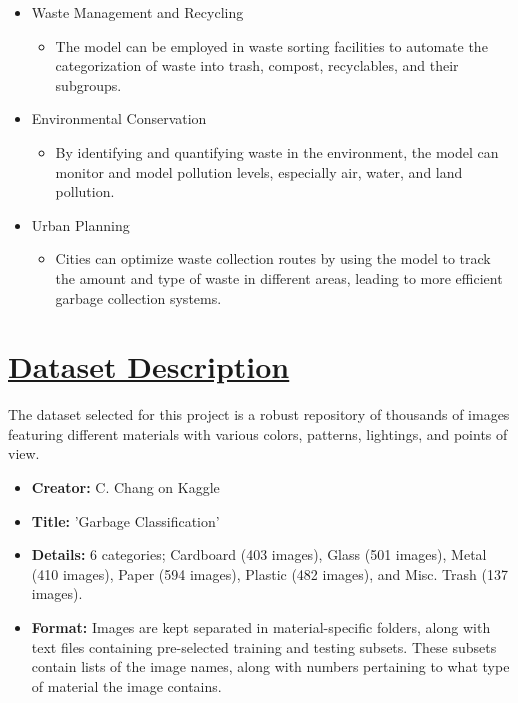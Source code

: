 \documentclass[conference]{IEEEtran}
\begin{document}
\begin{itemize}
  \item Waste Management and Recycling    
    \begin{itemize}
      \item The model can be employed in waste sorting facilities to automate the categorization of waste into trash, compost, recyclables, and their subgroups.
    \end{itemize} 
  \item Environmental Conservation
    \begin{itemize}
      \item By identifying and quantifying waste in the environment, the model can monitor and model pollution levels, especially air, water, and land pollution.
    \end{itemize}
  \item Urban Planning
    \begin{itemize}
      \item Cities can optimize waste collection routes by using the model to track the amount and type of waste in different areas, leading to more efficient garbage collection systems. 
    \end{itemize}
\end{itemize}


\section{\underline{Dataset Description}}
The dataset selected for this project is a robust repository of thousands of images featuring different materials with various colors, patterns, lightings, and points of view.

\begin{itemize}
    \item \textbf{Creator:} C. Chang on Kaggle
    \item \textbf{Title:} 'Garbage Classification'
    \item \textbf{Details:} 6 categories; Cardboard (403 images), Glass (501 images), Metal (410 images), Paper (594 images), Plastic (482 images), and Misc. Trash (137 images). 
    \item \textbf{Format:} Images are kept separated in material-specific folders, along with text files containing pre-selected training and testing subsets. These subsets contain lists of the image names, along with numbers pertaining to what type of material the image contains.
\end{itemize}
\end{document}
